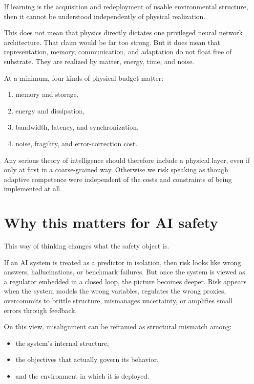 \documentclass[11pt]{article}
\begin{document}
If learning is the acquisition and redeployment of usable environmental structure, then it cannot be understood independently of physical realization.

This does not mean that physics directly dictates one privileged neural network architecture. That claim would be far too strong. But it does mean that representation, memory, communication, and adaptation do not float free of substrate. They are realized by matter, energy, time, and noise.

At a minimum, four kinds of physical budget matter:

\begin{enumerate}
\item memory and storage,
\item energy and dissipation,
\item bandwidth, latency, and synchronization,
\item noise, fragility, and error-correction cost.

\end{enumerate}

Any serious theory of intelligence should therefore include a physical layer, even if only at first in a coarse-grained way. Otherwise we risk speaking as though adaptive competence were independent of the costs and constraints of being implemented at all.

\section{Why this matters for AI safety}


This way of thinking changes what the safety object is.

If an AI system is treated as a predictor in isolation, then risk looks like wrong answers, hallucinations, or benchmark failures. But once the system is viewed as a regulator embedded in a closed loop, the picture becomes deeper. Risk appears when the system models the wrong variables, regulates the wrong proxies, overcommits to brittle structure, mismanages uncertainty, or amplifies small errors through feedback.

On this view, misalignment can be reframed as structural mismatch among:

\begin{itemize}
\item the system's internal structure,
\item the objectives that actually govern its behavior,
\item and the environment in which it is deployed.

\end{itemize}
\end{document}
